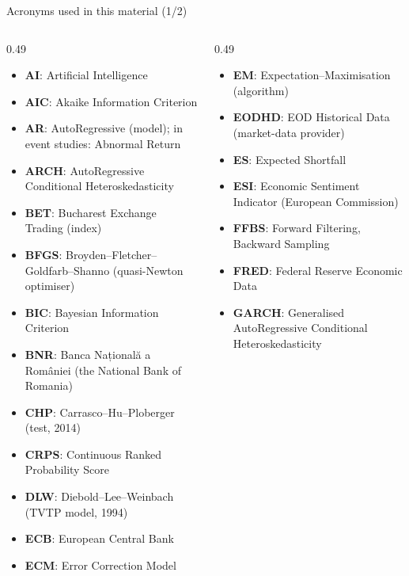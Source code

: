 \begin{frame}{Acronyms used in this material (1/2)}
\begin{columns}[T]
\begin{column}{0.49\textwidth}
\begin{itemize}\setlength{\itemsep}{0pt}
    \item \textbf{AI}: Artificial Intelligence
    \item \textbf{AIC}: Akaike Information Criterion
    \item \textbf{AR}: AutoRegressive (model); in event studies: Abnormal Return
    \item \textbf{ARCH}: AutoRegressive Conditional Heteroskedasticity
    \item \textbf{BET}: Bucharest Exchange Trading (index)
    \item \textbf{BFGS}: Broyden–Fletcher–Goldfarb–Shanno (quasi-Newton optimiser)
    \item \textbf{BIC}: Bayesian Information Criterion
    \item \textbf{BNR}: Banca Națională a României (the National Bank of Romania)
    \item \textbf{CHP}: Carrasco–Hu–Ploberger (test, 2014)
    \item \textbf{CRPS}: Continuous Ranked Probability Score
    \item \textbf{DLW}: Diebold–Lee–Weinbach (TVTP model, 1994)
    \item \textbf{ECB}: European Central Bank
    \item \textbf{ECM}: Error Correction Model
\end{itemize}
\end{column}
\begin{column}{0.49\textwidth}
\begin{itemize}\setlength{\itemsep}{0pt}
    \item \textbf{EM}: Expectation–Maximisation (algorithm)
    \item \textbf{EODHD}: EOD Historical Data (market-data provider)
    \item \textbf{ES}: Expected Shortfall
    \item \textbf{ESI}: Economic Sentiment Indicator (European Commission)
    \item \textbf{FFBS}: Forward Filtering, Backward Sampling
    \item \textbf{FRED}: Federal Reserve Economic Data
    \item \textbf{GARCH}: Generalised AutoRegressive Conditional Heteroskedasticity

\end{itemize}
\end{column}
\end{columns}
\end{frame}
